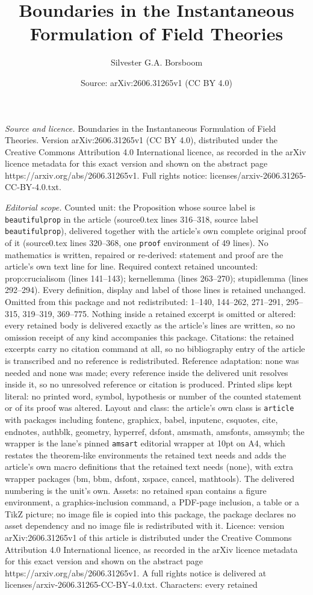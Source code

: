 \documentclass[10pt,a4paper]{amsart}
\title[Boundaries in the Instantaneous Formulation of Field Theorie]{Boundaries in the Instantaneous Formulation of Field Theories}
\author{Silvester G.A. Borsboom}
\date{Source: arXiv:2606.31265v1 (CC BY 4.0)}
\begin{document}
\maketitle

\noindent\emph{Source and licence.} Boundaries in the Instantaneous Formulation of Field Theories. Version arXiv:2606.31265v1 (CC BY 4.0), distributed under the Creative Commons Attribution 4.0 International licence, as recorded in the arXiv licence metadata for this exact version and shown on the abstract page https://arxiv.org/abs/2606.31265v1. Full rights notice: licenses/arxiv-2606.31265-CC-BY-4.0.txt.\par\smallskip

\noindent\textit{Editorial scope.} Counted unit: the Proposition whose source label is \texttt{beautifulprop} in the article (source0.tex lines 316--318, source label \texttt{beautifulprop}), delivered together with the article's own complete original proof of it (source0.tex lines 320--368, one \texttt{proof} environment of 49 lines). No mathematics is written, repaired or re-derived: statement and proof are the article's own text line for line. Required context retained uncounted: prop:crucialisom (lines 141--143); kernellemma (lines 263--270); stupidlemma (lines 292--294). Every definition, display and label of those lines is retained unchanged. Omitted from this package and not redistributed: 1--140, 144--262, 271--291, 295--315, 319--319, 369--775. Nothing inside a retained excerpt is omitted or altered: every retained body is delivered exactly as the article's lines are written, so no omission receipt of any kind accompanies this package. Citations: the retained excerpts carry no citation command at all, so no bibliography entry of the article is transcribed and no reference is redistributed. Reference adaptation: none was needed and none was made; every reference inside the delivered unit resolves inside it, so no unresolved reference or citation is produced. Printed slips kept literal: no printed word, symbol, hypothesis or number of the counted statement or of its proof was altered. Layout and class: the article's own class is \texttt{article} with packages including fontenc, graphicx, babel, inputenc, csquotes, cite, endnotes, authblk, geometry, hyperref, dsfont, amsmath, amsfonts, amssymb; the wrapper is the lane's pinned \texttt{amsart} editorial wrapper at 10pt on A4, which restates the theorem-like environments the retained text needs and adds the article's own macro definitions that the retained text needs (none), with extra wrapper packages (bm, bbm, dsfont, xspace, cancel, mathtools). The delivered numbering is the unit's own. Assets: no retained span contains a figure environment, a graphics-inclusion command, a PDF-page inclusion, a table or a TikZ picture; no image file is copied into this package, the package declares no asset dependency and no image file is redistributed with it. Licence: version arXiv:2606.31265v1 of this article is distributed under the Creative Commons Attribution 4.0 International licence, as recorded in the arXiv licence metadata for this exact version and shown on the abstract page https://arxiv.org/abs/2606.31265v1. A full rights notice is delivered at licenses/arxiv-2606.31265-CC-BY-4.0.txt. Characters: every retained 
\end{document}

